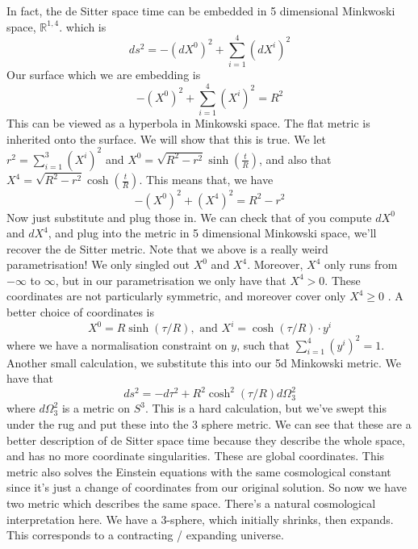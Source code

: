 In fact, the de Sitter space time can 
be embedded in 5 dimensional Minkwoski space, $ \mathbb{ R} ^{ 1, 4 } $. 
which is 
\[
	d s ^ 2 =  -  ( d X^ 0 ) ^ 2 + \sum_{ i = 1 } ^ 4 ( dX ^ i ) ^ 2 
\]  Our surface which we are embedding is 
\[
	- ( X^ 0 )^ 2 + \sum_{ i = 1 } ^ 4 ( X ^ i ) ^2  = R ^ 2 
\] This can be viewed as a hyperbola in Minkowski space. 
The flat metric is inherited onto the surface. 
We will show that this is true. 
We let $ r ^ 2  = \sum_{ i = 1 } ^ 3 ( X ^ i ) ^ 2 $ and $ X ^ 0 = \sqrt{ R ^ 2 - r ^ 2  } 
\sinh ( \frac{t}{ R } ) $, and also that $ X ^ 4  = \sqrt{ R ^ 2 - r ^ 2 }  \cosh ( \frac{t}{ R } ) $. 
This means that, we have \[
  - ( X ^ 0 ) ^ 2 + ( X ^ 4 ) ^ 2  = R ^ 2 - r ^ 2
\] Now just substitute and plug those in. We can check that 
of you compute $ d X ^ 0  $ and $ d X ^ 4 $, and plug into 
the metric in 5 dimensional Minkowski space, we'll recover 
the de Sitter metric. Note that we above is a really weird 
parametrisation! We only singled out $ X ^ 0$ and $ X ^ 4 $. 
Moreover, $ X ^ 4 $ only runs from $ - \infty $ to $ \infty $, 
but in our parametrisation we only have that 
$ X ^ 4 > 0 $. These coordinates are not particularly symmetric, 
and moreover cover only $ X ^ 4 \geq 0 $ . 
A better choice of coordinates is 
\[
	X ^ 0 = R \sinh \left(  \tau / R  \right) , \text{ and } X ^ i = \cosh \left(  \tau / R  \right)  \cdot   y
	^ i 
\] where we have a normalisation constraint on $ y $, such that $ \sum_{ i   = 1 } ^ 4 ( y ^ i ) ^ 2  = 1$. 
Another small calculation, we substitute this 
into our 5d Minkowski metric. We have that 
\[
 d s^ 2  = - d \tau ^ 2 + R ^ 2 \cosh ^ 2 \left(  \tau / R  \right)  d \Omega_ 3 ^ 2 
\] where $ d \Omega _ 3 ^ 2 $ is a metric on  $  S^ 3 $. 
This is a hard calculation, but we've swept this under the rug 
and put these into the $ 3 $ sphere metric. 
We can see that these are a better 
description of de Sitter space time because they describe the whole space, 
and has no more coordinate singularities. 
These are global coordinates. This metric also solves 
the Einstein equations with the same cosmological constant
since it's just a change of coordinates 
from our original solution. 
So now we have two metric which describes the same space. 
There's a natural cosmological interpretation here. 
We have a 3-sphere, which initially shrinks, then expands. This 
corresponds to a contracting / expanding universe. 

